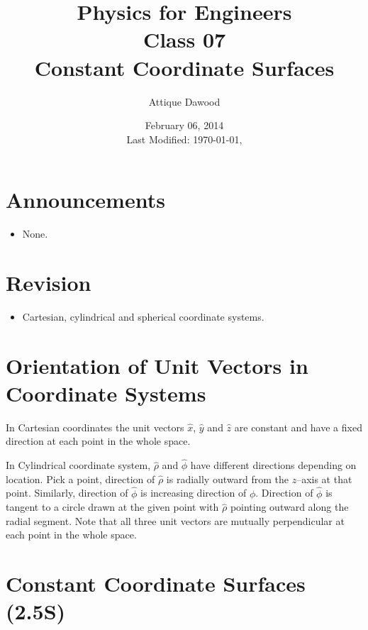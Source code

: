 \documentclass[12pt,a4paper]{article}
\title{\vspace{-2cm}Physics for Engineers\\Class 07\\Constant Coordinate Surfaces}
\author{Attique Dawood}
\date{February 06, 2014\\[0.2cm] Last Modified: \today, \currenttime}
\begin{document}
\maketitle
\section{Announcements}
\begin{itemize}
\item None.
\end{itemize}
\section{Revision}
\begin{itemize}
\item Cartesian, cylindrical and spherical coordinate systems.
\end{itemize}
\section{Orientation of Unit Vectors in Coordinate Systems}
In Cartesian coordinates the unit vectors $\hat x$, $\hat y$ and $\hat z$ are constant and have a fixed direction at each point in the whole space.

In Cylindrical coordinate system, $\hat \rho$ and $\hat \phi$ have different directions depending on location. Pick a point, direction of $\hat \rho$ is radially outward from the $z$--axis at that point. Similarly, direction of $\hat \phi$ is increasing direction of $\phi$. Direction of $\hat \phi$ is tangent to a circle drawn at the given point with $\hat \rho$ pointing outward along the radial segment. Note that all three unit vectors are mutually perpendicular at each point in the whole space.
\section{Constant Coordinate Surfaces (2.5S)}
\end{document}
